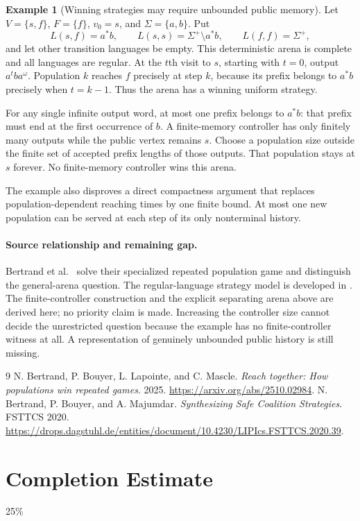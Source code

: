 \documentclass[11pt]{article}
\theoremstyle{definition}
\newtheorem{example}{Example}
\theoremstyle{remark}
\begin{document}
\begin{example}[Winning strategies may require unbounded public memory]
Let $V=\{s,f\}$, $F=\{f\}$, $v_0=s$, and $\Sigma=\{a,b\}$. Put
\[
 L(s,f)=a^*b,\qquad L(s,s)=\Sigma^+\setminus a^*b,
 \qquad L(f,f)=\Sigma^+,
\]
and let other transition languages be empty. This deterministic arena is complete and all languages are regular. At the $t$th visit to $s$, starting with $t=0$, output $a^tba^\omega$. Population $k$ reaches $f$ precisely at step $k$, because its prefix belongs to $a^*b$ precisely when $t=k-1$. Thus the arena has a winning uniform strategy.

For any single infinite output word, at most one prefix belongs to $a^*b$: that prefix must end at the first occurrence of $b$. A finite-memory controller has only finitely many outputs while the public vertex remains $s$. Choose a population size outside the finite set of accepted prefix lengths of those outputs. That population stays at $s$ forever. No finite-memory controller wins this arena.
\end{example}

The example also disproves a direct compactness argument that replaces population-dependent reaching times by one finite bound. At most one new population can be served at each step of its only nonterminal history.

\paragraph{Source relationship and remaining gap.}
Bertrand et al.~\cite{reach} solve their specialized repeated population game and distinguish the general-arena question. The regular-language strategy model is developed in \cite{safe}. The finite-controller construction and the explicit separating arena above are derived here; no priority claim is made. Increasing the controller size cannot decide the unrestricted question because the example has no finite-controller witness at all. A representation of genuinely unbounded public history is still missing.

\begin{thebibliography}{9}
 N. Bertrand, P. Bouyer, L. Lapointe, and C. Mascle.
\emph{Reach together: How populations win repeated games}. 2025.
\url{https://arxiv.org/abs/2510.02984}.
 N. Bertrand, P. Bouyer, and A. Majumdar.
\emph{Synthesizing Safe Coalition Strategies}. FSTTCS 2020.
\url{https://drops.dagstuhl.de/entities/document/10.4230/LIPIcs.FSTTCS.2020.39}.
\end{thebibliography}

\section{Completion Estimate}
25\%
\end{document}
